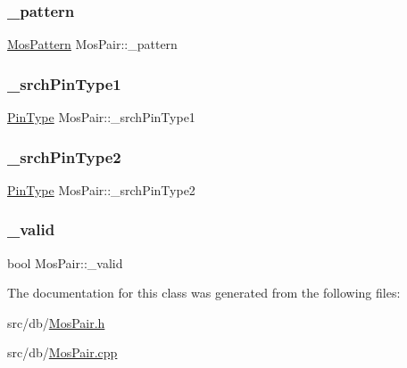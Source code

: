 \mbox{\label{classMosPair_a075dadc02f1a5b85d53bf7b2271f8825}} 
\subsubsection{\texorpdfstring{\+\_\+pattern}{\_pattern}}
{\footnotesize\ttfamily \hyperlink{type_8h_af19eddb079bfea723256710b029c38e8}{Mos\+Pattern} Mos\+Pair\+::\+\_\+pattern\hspace{0.3cm}{\ttfamily [private]}}

\mbox{\label{classMosPair_a54111cc25c62331c5c4e3c0aee23ac54}} 
\subsubsection{\texorpdfstring{\+\_\+srch\+Pin\+Type1}{\_srchPinType1}}
{\footnotesize\ttfamily \hyperlink{type_8h_afaab50027002ecbb6c8ac27e727d1bb4}{Pin\+Type} Mos\+Pair\+::\+\_\+srch\+Pin\+Type1\hspace{0.3cm}{\ttfamily [private]}}

\mbox{\label{classMosPair_ad05a079ecda10e5527b3c8d5b11f6ac2}} 
\subsubsection{\texorpdfstring{\+\_\+srch\+Pin\+Type2}{\_srchPinType2}}
{\footnotesize\ttfamily \hyperlink{type_8h_afaab50027002ecbb6c8ac27e727d1bb4}{Pin\+Type} Mos\+Pair\+::\+\_\+srch\+Pin\+Type2\hspace{0.3cm}{\ttfamily [private]}}

\mbox{\label{classMosPair_a7a0adcf1db1e0b59d09f1a4270bf8efb}} 
\subsubsection{\texorpdfstring{\+\_\+valid}{\_valid}}
{\footnotesize\ttfamily bool Mos\+Pair\+::\+\_\+valid\hspace{0.3cm}{\ttfamily [private]}}



The documentation for this class was generated from the following files\+:\begin{DoxyCompactItemize}
\item 
src/db/\hyperlink{MosPair_8h}{Mos\+Pair.\+h}\item 
src/db/\hyperlink{MosPair_8cpp}{Mos\+Pair.\+cpp}\end{DoxyCompactItemize}
